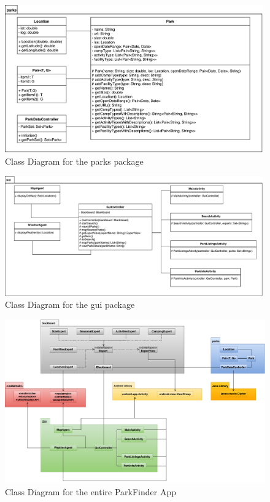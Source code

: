 \documentclass[titlepage,12pt]{article}
\begin{document}
\begin{figure}[H]
    \centerline{\includegraphics[width=0.99\textwidth]{class_diagrams/parks_ClassDiagram}}
    \caption{Class Diagram for the parks package}
    \label{fig:parks_classDiagram}
\end{figure}

\begin{figure}[H]
    \centerline{\includegraphics[width=0.99\textwidth]{class_diagrams/gui_ClassDiagram}}
    \caption{Class Diagram for the gui package}
    \label{fig:gui_classDiagram}
\end{figure}

\begin{figure}[H]
    \centerline{\includegraphics[width=1.0\textwidth]
    {class_diagrams/all(small_colour)_ClassDiagram}}
    \caption{Class Diagram for the entire ParkFinder App}
    \label{fig:all_classDiagram}
\end{figure}
\end{document}
